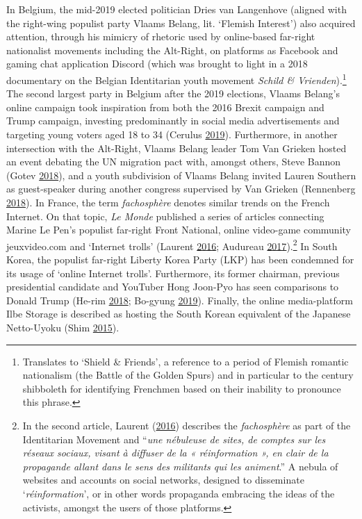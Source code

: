 \documentclass[10pt,british,A4paper,oneside]{memoir}
\begin{document}
In Belgium, the mid-2019 elected politician Dries van Langenhove
(aligned with the right-wing populist party Vlaams Belang, lit. `Flemish
Interest') also acquired attention, through his mimicry of rhetoric used
by online-based far-right nationalist movements including the Alt-Right,
on platforms as Facebook and gaming chat application Discord (which was
brought to light in a 2018 documentary on the Belgian Identitarian youth
movement \emph{Schild \& Vrienden}).\footnote{Translates to `Shield \&
  Friends', a reference to a period of Flemish romantic nationalism (the
  Battle of the Golden Spurs) and in particular to the  century
  shibboleth for identifying Frenchmen based on their inability to
  pronounce this phrase.} The second largest party in Belgium after the
2019 elections, Vlaams Belang's online campaign took inspiration from
both the 2016 Brexit campaign and Trump campaign, investing predominantly
in social media advertisements and targeting young voters aged 18 to 34
(Cerulus \protect\hyperlink{ref-cerulus_inside_2019}{2019}).
Furthermore, in another intersection with the Alt-Right, Vlaams Belang
leader Tom Van Grieken hosted an event debating the UN migration pact
with, amongst others, Steve Bannon (Gotev
\protect\hyperlink{ref-gotev_vlaams_2018}{2018}), and a youth
subdivision of Vlaams Belang invited Lauren Southern as guest-speaker
during another congress supervised by Van Grieken (Rennenberg
\protect\hyperlink{ref-rennenberg_vlaams_2018}{2018}). In France, the
term \emph{fachosphère} denotes similar trends on the French Internet. On that topic, \emph{Le Monde} published a series of articles 
connecting Marine Le Pen's populist far-right Front National, online
video-game community jeuxvideo.com and `Internet trolls' (Laurent
\protect\hyperlink{ref-laurent_nordactu_2016}{2016}; Audureau
\protect\hyperlink{ref-audureau_les_2017}{2017}).\footnote{In the second
  article, Laurent (\protect\hyperlink{ref-laurent_nordactu_2016}{2016})
  describes the \emph{fachosphère} as part of the Identitarian Movement
  and ``\emph{une nébuleuse de sites, de comptes sur les réseaux
  sociaux, visant à diffuser de la « réinformation », en clair de la
  propagande allant dans le sens des militants qui les animent}.'' A
  nebula of websites and accounts on social networks, designed to
  disseminate `\emph{réinformation}', or in other words propaganda
  embracing the ideas of the activists, amongst the users of those
  platforms.} In South Korea, the populist far-right Liberty Korea Party
(LKP) has been condemned for its usage of `online Internet trolls'.
Furthermore, its former chairman, previous presidential candidate and
YouTuber Hong Joon-Pyo has seen comparisons to Donald Trump (He-rim
\protect\hyperlink{ref-he-rim_firebrand_2018}{2018}; Bo-gyung
\protect\hyperlink{ref-bo-gyung_youtube_2019}{2019}). Finally, the
online media-platform Ilbe Storage is described as hosting the South
Korean equivalent of the Japanese Netto-Uyoku (Shim
\protect\hyperlink{ref-shim_hardcore_2015}{2015}).
\end{document}
